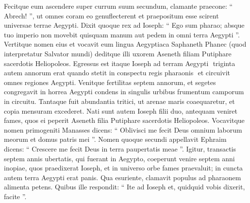 \begin{biblechapter}
\begin{biblechapter}
\begin{biblechapter}
\begin{biblechapter}
\begin{biblechapter}
\begin{biblechapter}
\begin{biblechapter}
\begin{biblechapter}
\begin{biblechapter}
\begin{biblechapter}
\begin{biblechapter}
\begin{biblechapter}
\begin{biblechapter}
\begin{biblechapter}
\begin{biblechapter}
\begin{biblechapter}
\begin{biblechapter}
\begin{biblechapter}
\begin{biblechapter}
\begin{biblechapter}
\begin{biblechapter}
\begin{biblechapter}
\begin{biblechapter}
\begin{biblechapter}
\begin{biblechapter}
\begin{biblechapter}
\begin{biblechapter}
\begin{biblechapter}
\begin{biblechapter}
\begin{biblechapter}
\begin{biblechapter}
\begin{biblechapter}
\begin{biblechapter}
\begin{biblechapter}
\begin{biblechapter}
\begin{biblechapter}
\begin{biblechapter}
\begin{biblechapter}
\begin{biblechapter}
\begin{biblechapter}
\begin{biblechapter}
\verse Fecitque eum ascendere super currum suum secundum, clamante praecone: “ Abrech! ”, ut omnes coram eo genuflecterent et praepositum esse scirent universae terrae Aegypti.
 \verse Dixit quoque rex ad Ioseph: “ Ego sum pharao; absque tuo imperio non movebit quisquam manum aut pedem in omni terra Aegypti ”. 
\verse Vertitque nomen eius et vocavit eum lingua Aegyptiaca Saphaneth Phanec (quod interpretatur Salvator mundi) deditque illi uxorem Aseneth filiam Putiphare sacerdotis Heliopoleos.
 Egressus est itaque Ioseph ad terram Aegypti 
\verse ­ triginta autem annorum erat quando stetit in conspectu regis pharaonis ­ et circuivit omnes regiones Aegypti.
 \verse Venitque fertilitas septem annorum, et segetes congregavit in horrea Aegypti 
\verse condens in singulis urbibus frumentum camporum in circuitu. 
\verse Tantaque fuit abundantia tritici, ut arenae maris coaequaretur, et copia mensuram excederet.
 \verse Nati sunt autem Ioseph filii duo, antequam veniret fames, quos ei peperit Aseneth filia Putiphare sacerdotis Heliopoleos. 
\verse Vocavitque nomen primogeniti Manasses dicens: “ Oblivisci me fecit Deus omnium laborum meorum et domus patris mei ”. 
\verse Nomen quoque secundi appellavit Ephraim dicens: “ Crescere me fecit Deus in terra paupertatis meae ”.
 \verse Igitur, transactis septem annis ubertatis, qui fuerant in Aegypto, 
\verse coeperunt venire septem anni inopiae, quos praedixerat Ioseph, et in universo orbe fames praevaluit; in cuncta autem terra Aegypti erat panis. 
\verse Qua esuriente, clamavit populus ad pharaonem alimenta petens. Quibus ille respondit: “ Ite ad Ioseph et, quidquid vobis dixerit, facite ”. 

\end{biblechapter}
\end{biblechapter}
\end{biblechapter}
\end{biblechapter}
\end{biblechapter}
\end{biblechapter}
\end{biblechapter}
\end{biblechapter}
\end{biblechapter}
\end{biblechapter}
\end{biblechapter}
\end{biblechapter}
\end{biblechapter}
\end{biblechapter}
\end{biblechapter}
\end{biblechapter}
\end{biblechapter}
\end{biblechapter}
\end{biblechapter}
\end{biblechapter}
\end{biblechapter}
\end{biblechapter}
\end{biblechapter}
\end{biblechapter}
\end{biblechapter}
\end{biblechapter}
\end{biblechapter}
\end{biblechapter}
\end{biblechapter}
\end{biblechapter}
\end{biblechapter}
\end{biblechapter}
\end{biblechapter}
\end{biblechapter}
\end{biblechapter}
\end{biblechapter}
\end{biblechapter}
\end{biblechapter}
\end{biblechapter}
\end{biblechapter}
\end{biblechapter}
